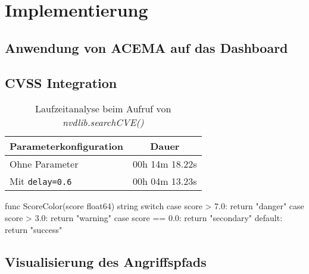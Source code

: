 \chapter{Implementierung}
\label{chap:implementierung}
\section[Anwendung von ACEMA]{Anwendung von ACEMA auf das Dashboard}
\label{sec:impl-anwendungVonAcema}
\section{CVSS Integration}
\label{sec:impl-cvssIntegration}

\begin{table}[H]
    \centering
    \caption{Laufzeitanalyse beim Aufruf von \textit{nvdlib.searchCVE()}}
    \begin{tabular}{|l|c|}
        \hline
        \textbf{Parameterkonfiguration} & \textbf{Dauer} \\
        \hline
        Ohne Parameter                & 00h 14m 18.22s \\
        Mit \texttt{delay=0.6}        & 00h 04m 13.23s \\
        \hline
    \end{tabular}
\end{table}

\begin{code}[caption={Implementierung der farblichen Kategorisierung von Schweregraden}]
func ScoreColor(score float64) string {
    switch {
    case score > 7.0:
        return "danger"
    case score > 3.0:
        return "warning"
    case score == 0.0:
        return "secondary"
    default:
        return "success"
    }
}
\end{code}

\section{Visualisierung des Angriffspfads}
\label{sec:impl-visualisierungDesAngriffspfads}